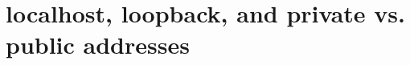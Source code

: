 \chapter{localhost, loopback, and private vs. public addresses}
\label{ch:localhost-loopback-and-private-vs}


